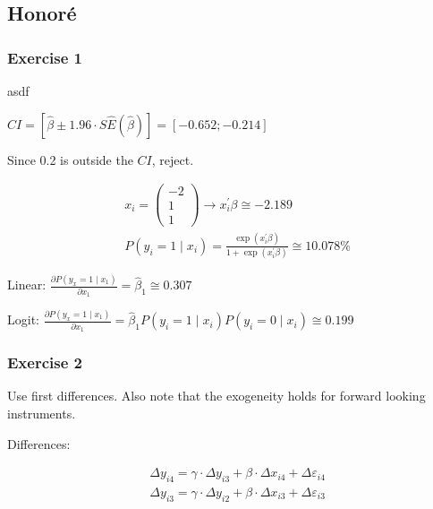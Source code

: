 \newpage
{
\subsection*{Honor\'e}

{
\subsubsection*{Exercise 1}

\begin{enumerate}[label=(\arabic*)]
{\item 
\color{white}asdf\color{black}
\begin{enumerate}[label=(\alph*)]
{\item 
$C I=[\hat{\beta} \pm 1.96 \cdot S \hat{E}(\hat{\beta})]=[-0.652 ;-0.214]$
}
{\item 
Since 0.2 is outside the $C I$, reject.
}
\end{enumerate}
}
{\item 
$$
\begin{aligned}
& x_{i}=\left(\begin{array}{c}
-2 \\
1 \\
1
\end{array}\right) \longrightarrow x_{i}^{\prime} \beta \cong-2.189 \\
& P\left(y_{i}=1 \mid x_{i}\right)=\frac{\exp \left(x_{i}^{\prime} \beta\right)}{1+\exp \left(x_{i}^{\prime} \beta\right)} \cong 10.078 \%
\end{aligned}
$$
}
{\item 
Linear: $\frac{\partial P\left(y_{x}=1\mid x_{1}\right)}{\partial x_{1}}=\hat{\beta}_{1} \cong 0.307$

Logit: $\frac{\partial P\left(y_{x}=1\mid x_{1}\right)}{\partial x_{1}}=\hat{\beta}_{1} P\left(y_{i}=1 \mid x_{i}\right) P\left(y_{i}=0 \mid x_{i}\right) \cong 0.199$
}
\end{enumerate}
}
{
\subsubsection*{Exercise 2}

Use first differences. Also note that the exogeneity holds for forward looking instruments.

Differences:

$$
\begin{aligned}
& \Delta y_{i 4}=\gamma \cdot \Delta y_{i 3}+\beta \cdot \Delta x_{i 4}+\Delta \varepsilon_{i 4} \\
& \Delta y_{i 3}=\gamma \cdot \Delta y_{i 2}+\beta \cdot \Delta x_{i 3}+\Delta \varepsilon_{i 3}
\end{aligned}
$$

}}
